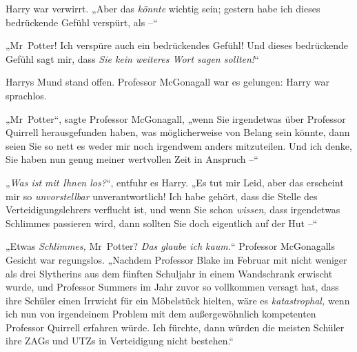 Harry war verwirrt. „Aber das \emph{könnte} wichtig sein; gestern habe ich dieses bedrückende Gefühl verspürt, als –“

„Mr~Potter! Ich verspüre auch ein bedrückendes Gefühl! Und dieses bedrückende Gefühl sagt mir, dass \emph{Sie kein weiteres Wort sagen sollten!}“

Harrys Mund stand offen. Professor McGonagall war es gelungen: Harry war sprachlos.

„Mr~Potter“, sagte Professor McGonagall, „wenn Sie irgendetwas über Professor Quirrell herausgefunden haben, was möglicherweise von Belang sein könnte, dann seien Sie so nett es weder mir noch irgendwem anders mitzuteilen. Und ich denke, Sie haben nun genug meiner wertvollen Zeit in Anspruch –“

„\emph{Was ist mit Ihnen los?}“, entfuhr es Harry. „Es tut mir Leid, aber das erscheint mir so \emph{unvorstellbar} unverantwortlich! Ich habe gehört, dass die Stelle des Verteidigungslehrers verflucht ist, und wenn Sie schon \emph{wissen,} dass irgendetwas Schlimmes passieren wird, dann sollten Sie doch eigentlich auf der Hut –“

„Etwas \emph{Schlimmes,} Mr~Potter? \emph{Das glaube ich kaum.}“ Professor McGonagalls Gesicht war regungslos. „Nachdem Professor Blake im Februar mit nicht weniger als drei Slytherins aus dem fünften Schuljahr in einem Wandschrank erwischt wurde, und Professor Summers im Jahr zuvor so vollkommen versagt hat, dass ihre Schüler einen Irrwicht für ein Möbelstück hielten, wäre es \emph{katastrophal,} wenn ich nun von irgendeinem Problem mit dem außergewöhnlich kompetenten Professor Quirrell erfahren würde. Ich fürchte, dann würden die meisten Schüler ihre ZAGs und UTZs in Verteidigung nicht bestehen.“

